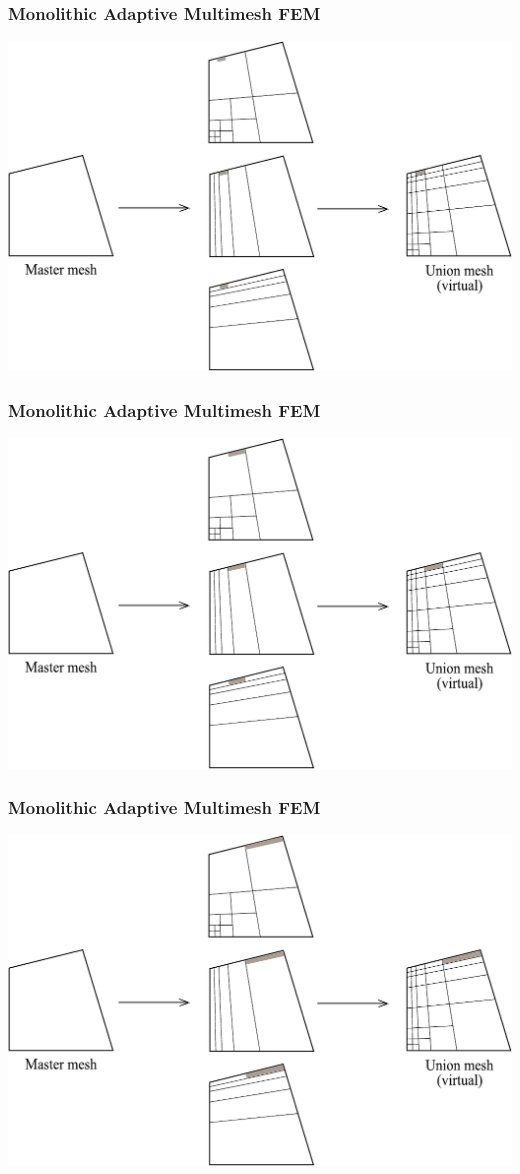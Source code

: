 \begin{frame}
  \frametitle{Monolithic Adaptive Multimesh FEM}
  \begin{center}
    \includegraphics[height=0.7\textheight]{multimesh/mm_32.pdf}
  \end{center}
\end{frame}

\begin{frame}
  \frametitle{Monolithic Adaptive Multimesh FEM}
  \begin{center}
    \includegraphics[height=0.7\textheight]{multimesh/mm_33.pdf}
  \end{center}
\end{frame}

\begin{frame}
  \frametitle{Monolithic Adaptive Multimesh FEM}
  \begin{center}
    \includegraphics[height=0.7\textheight]{multimesh/mm_34.pdf}
  \end{center}
\end{frame}
